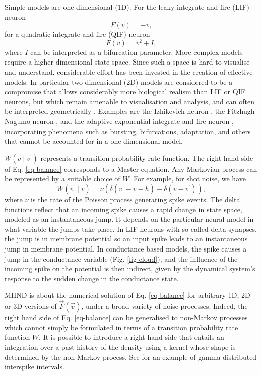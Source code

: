 \documentclass[utf8]{frontiersSCNS} %
\begin{document}
Simple models are one-dimensional (1D). For the leaky-integrate-and-fire (LIF) neuron 
\begin{equation}
F(v) = -v,
\end{equation}  
for a quadratic-integrate-and-fire (QIF) neuron
\begin{equation}
F(v)= v^2 + I,
\end{equation}  
where $I$ can be interpreted as a bifurcation parameter. More complex models require a higher dimensional state space. Since
such a space is hard to visualise and understand, considerable effort has been invested in the creation of effective models. In particular two-dimensional (2D) models are considered to be a compromise that allows considerably more biological realism than LIF or QIF neurons, but which remain amenable to visualisation and analysis, and can often be interpreted geometrically \citep{izhikevich2007dynamical}. Examples are the Izhikevich neuron
\citep{izhikevich2003simple}, the Fitzhugh-Nagumo neuron \citep{fitzhugh1961impulses,nagumo1962active}, and the adaptive-exponential-integrate-and-fire neuron \citep{brette2005}, incorporating phenomena such as bursting, bifurcations, adaptation, and others that cannot be accounted for in a one dimensional model.

$W(v \mid v^{\prime})$ represents a transition probability rate function. The right hand side of Eq. \ref{eq-balance} corresponds to a Master equation. Any Markovian process can be represented by a suitable choice of $W$. For example,
for shot noise, we have
\begin{equation}   
\label{master_equation}
  W(v^{\prime} \mid v) = \nu (\delta (v^{\prime} - v - h)  - \delta( v - v^{\prime})),  
\end{equation}
where $\nu$ is the rate of the Poisson process generating spike events. The delta functions reflect that an incoming spike causes a rapid change in state space, modeled as an instantaneous jump. It depends on the particular neural model
in what variable the jumps take place. In LIF neurons with so-called delta synapses, the jump is in membrane potential
so an input spike leads to an instantaneous jump in membrane potential. In conductance based models, the spike causes a
jump in the conductance variable (Fig. \ref{fig-cloud}), and the influence of the incoming spike on the potential is then
indirect, given by the dynamical system's response to the 
sudden change in the conductance state.

MIIND is about the numerical solution of Eq. \ref{eq-balance} for
arbitrary 1D, 2D or 3D versions of $\vec{F}(\vec{v})$, under a broad variety of noise processes. Indeed, the right hand side of Eq. \ref{eq-balance} can be generalised to non-Markov processes which cannot simply be formulated in terms of a transition probability rate function $W$. It is possible to introduce a right hand side that entails an integration over a past history of the density using a kernel whose shape is determined by the non-Markov process. See \cite{lai2017population} for an example of gamma distributed interspike intervals.\\
\end{document}
